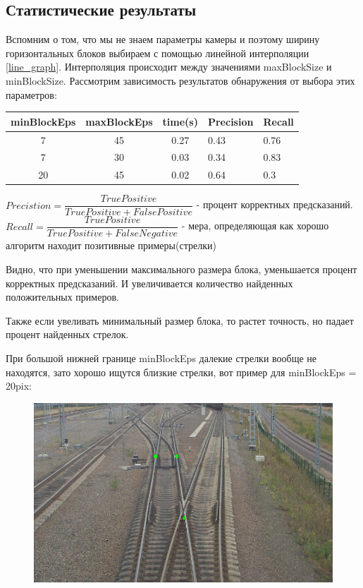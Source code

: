 \newpage
\subsection{Статистические результаты}
Вспомним о том, что мы не знаем параметры камеры и поэтому ширину горизонтальных блоков выбираем с помощью линейной интерполяции \ref{line_graph}. Интерполяция происходит между значениями maxBlockSize и minBlockSize. 
Рассмотрим зависимость результатов обнаружения от выбора этих параметров:
\begin{table}[!h]
	\begin{tabular}{|c|c|c|l|l|}
		\hline
		\multicolumn{1}{|l|}{\textbf{minBlockEps}} & \multicolumn{1}{l|}{\textbf{maxBlockEps}} & \multicolumn{1}{l|}{\textbf{time(s)}} & \textbf{Precision} & \textbf{Recall} \\ \hline
		7                                          & 45                                        & 0.27                                   & 0.43               & 0.76            \\ \hline
		7                                          & 30                                        & 0.03                                   & 0.34                & 0.83            \\ \hline
		20                                         & 45                                        & 0.02                                  & 0.64               & 0.3             \\ \hline
	\end{tabular}
\end{table}
\newline
$Precistion = \dfrac{TruePositive}{TruePositive + FalsePositive}$ - процент корректных предсказаний.
\newline
$Recall = \dfrac{TruePositive}{TruePositive + FalseNegative}$ - мера, определяющая как хорошо алгоритм находит позитивные примеры(стрелки)

Видно, что при уменьшении максимального размера блока, уменьшается процент корректных предсказаний. И увеличивается количество найденных положительных примеров. 

Также если увеливать минимальный размер блока, то растет точность, но падает процент найденных стрелок.

При большой нижней границе minBlockEps далекие стрелки вообще не находятся, зато хорошо ищутся близкие стрелки, вот пример для minBlockEps = 20pix:
\begin{figure}[!h]
	\centering
	\includegraphics[width=0.7\linewidth]{pictures/45_20.png}
	\caption[Y - обратное]{}
	\label{fig:45_20}
\end{figure}

